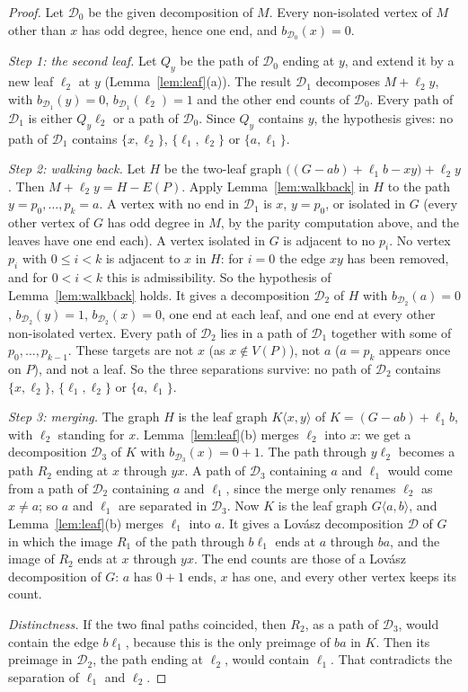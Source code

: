 \documentclass[11pt]{amsart}
\theoremstyle{definition}
\newcommand{\cD}{\mathcal D}
\begin{document}
\begin{proof}
Let $\cD_0$ be the given decomposition of $M$. Every non-isolated vertex of $M$ other than $x$ has
odd degree, hence one end, and $b_{\cD_0}(x)=0$.

\emph{Step 1: the second leaf.} Let $Q_y$ be the path of $\cD_0$ ending at $y$, and extend it by a
new leaf $\ell_2$ at $y$ (Lemma~\ref{lem:leaf}(a)). The result $\cD_1$ decomposes $M+\ell_2y$,
with $b_{\cD_1}(y)=0$, $b_{\cD_1}(\ell_2)=1$ and the other end counts of $\cD_0$. Every path of
$\cD_1$ is either $Q_y\ell_2$ or a path of $\cD_0$. Since $Q_y$ contains $y$, the hypothesis gives:
no path of $\cD_1$ contains $\{x,\ell_2\}$, $\{\ell_1,\ell_2\}$ or $\{a,\ell_1\}$.

\emph{Step 2: walking back.} Let $H$ be the two-leaf graph $\bigl((G-ab)+\ell_1b-xy\bigr)+\ell_2y$.
Then $M+\ell_2y=H-E(P)$. Apply Lemma~\ref{lem:walkback} in $H$ to the path $y=p_0,\dots,p_k=a$. A
vertex with no end in $\cD_1$ is $x$, $y=p_0$, or isolated in $G$ (every other vertex of $G$ has
odd degree in $M$, by the parity computation above, and the leaves have one end each). A vertex
isolated in $G$ is adjacent to no $p_i$. No vertex $p_i$ with $0\le i<k$ is
adjacent to $x$ in $H$: for $i=0$ the edge $xy$ has been removed, and for $0<i<k$ this is
admissibility. So the hypothesis of Lemma~\ref{lem:walkback} holds. It gives a decomposition
$\cD_2$ of $H$ with $b_{\cD_2}(a)=0$, $b_{\cD_2}(y)=1$, $b_{\cD_2}(x)=0$, one end at each leaf, and
one end at every other non-isolated vertex. Every path of $\cD_2$ lies in a path of $\cD_1$
together with some of $p_0,\dots,p_{k-1}$. These targets are not $x$ (as $x\notin V(P)$), not $a$
($a=p_k$ appears once on $P$), and not a leaf. So the three separations survive:
no path of $\cD_2$ contains $\{x,\ell_2\}$, $\{\ell_1,\ell_2\}$ or $\{a,\ell_1\}$.

\emph{Step 3: merging.} The graph $H$ is the leaf graph $K\langle x,y\rangle$ of
$K=(G-ab)+\ell_1b$, with $\ell_2$ standing for $x$. Lemma~\ref{lem:leaf}(b) merges $\ell_2$ into
$x$: we get a decomposition $\cD_3$ of $K$ with $b_{\cD_3}(x)=0+1$. The path through $y\ell_2$
becomes a path $R_2$ ending at $x$ through $yx$. A path of $\cD_3$ containing $a$ and $\ell_1$
would come from a path of $\cD_2$ containing $a$ and $\ell_1$, since the merge only renames
$\ell_2$ as $x\ne a$; so $a$ and $\ell_1$ are separated in $\cD_3$. Now $K$ is the leaf graph
$G\langle a,b\rangle$, and Lemma~\ref{lem:leaf}(b) merges $\ell_1$ into $a$. It gives a Lov\'asz
decomposition $\cD$ of $G$ in which the image $R_1$ of the path through $b\ell_1$ ends at $a$
through $ba$, and the image of $R_2$ ends at $x$ through $yx$. The end counts are those of a
Lov\'asz decomposition of $G$: $a$ has $0+1$ ends, $x$ has one, and every other vertex keeps its
count.

\emph{Distinctness.} If the two final paths coincided, then $R_2$, as a path of $\cD_3$, would
contain the edge $b\ell_1$, because this is the only preimage of $ba$ in $K$. Then its preimage in
$\cD_2$, the path ending at $\ell_2$, would contain $\ell_1$. That contradicts the separation of
$\ell_1$ and $\ell_2$.
\end{proof}
\end{document}

